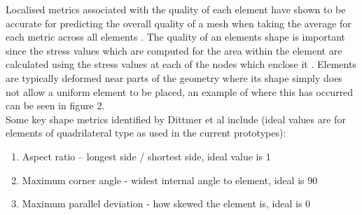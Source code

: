 \noindent
Localised metrics associated with the quality of each element have shown to be accurate for predicting the overall quality of a mesh when taking the average for each metric across all elements \cite{DittmerMeshQualityMet}. The quality of an elements shape is important since the stress values which are computed for the area within the element are calculated using the stress values at each of the nodes which enclose it \cite{IntroductionToFE}. Elements are typically deformed near parts of the geometry where its shape simply does not allow a uniform element to be placed, an example of where this has occurred can be seen in figure 2.\\ 

\noindent
Some key shape metrics identified by Dittmer et al include (ideal values are for elements of quadrilateral type as used in  the current prototypes):

\begin{enumerate}[label=\Alph*]
\item Aspect ratio – longest side / shortest side, ideal value is 1
\item Maximum corner angle - widest internal angle to element, ideal is 90\degree
\item Maximum parallel deviation - how skewed the element is, ideal is 0\degree
\end{enumerate}